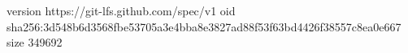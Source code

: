 version https://git-lfs.github.com/spec/v1
oid sha256:3d548b6d3568fbe53705a3e4bba8e3827ad88f53f63bd4426f38557c8ea0e667
size 349692
